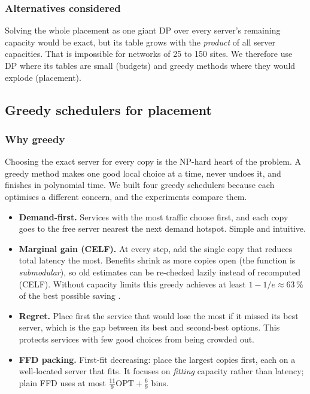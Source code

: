 \subsubsection{Alternatives considered}
Solving the whole placement as one giant DP over every server's remaining capacity would be exact, but its table grows with the \emph{product} of all server capacities. That is impossible for networks of 25 to 150 sites. We therefore use DP where its tables are small (budgets) and greedy methods where they would explode (placement).

\subsection{Greedy schedulers for placement}
\subsubsection{Why greedy}
Choosing the exact server for every copy is the NP-hard heart of the problem. A greedy method makes one good local choice at a time, never undoes it, and finishes in polynomial time. We built four greedy schedulers because each optimises a different concern, and the experiments compare them.
\begin{itemize}[leftmargin=*]
  \item \textbf{Demand-first.} Services with the most traffic choose first, and each copy goes to the free server nearest the next demand hotspot. Simple and intuitive.
  \item \textbf{Marginal gain (CELF).} At every step, add the single copy that reduces total latency the most. Benefits shrink as more copies open (the function is \emph{submodular}), so old estimates can be re-checked lazily instead of recomputed (CELF). Without capacity limits this greedy achieves at least $1-1/e\approx63\,\%$ of the best possible saving \cite{nemhauser1978}.
  \item \textbf{Regret.} Place first the service that would lose the most if it missed its best server, which is the gap between its best and second-best options. This protects services with few good choices from being crowded out.
  \item \textbf{FFD packing.} First-fit decreasing: place the largest copies first, each on a well-located server that fits. It focuses on \emph{fitting} capacity rather than latency; plain FFD uses at most $\tfrac{11}{9}\mathrm{OPT}+\tfrac{6}{9}$ bins.
\end{itemize}

